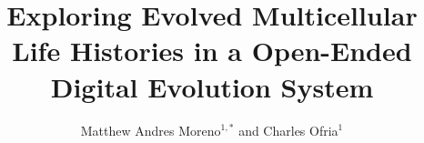 \documentclass[utf8]{frontiersSCNS} %
\def\firstAuthorLast{Moreno {et~al.}} %
\def\Authors{Matthew Andres Moreno$^{1,*}$ and Charles Ofria$^{1}$}
\begin{document}
\onecolumn
{}

\title[Exploring Evolved Multicellular Life Histories]{Exploring Evolved Multicellular Life Histories in a Open-Ended Digital Evolution System}

\author[\firstAuthorLast ]{\Authors} %
\address{} %
\correspondance{} %

\extraAuth{}%


\maketitle







\footnotesize


\clearpage
\newpage

\appendix


\end{document}
